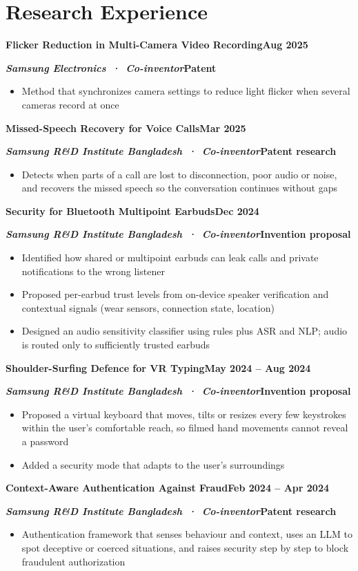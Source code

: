 \documentclass[10pt,letterpaper]{article}
\newcommand{\head}[2]{\Needspace{6\baselineskip}\textbf{#1}\hfill\textbf{#2}\par}
\newcommand{\sub}[2]{\textbf{\textit{#1}}\hfill\textbf{#2}\par}
\newcommand{\gap}{\vspace{3pt}}
\begin{document}
\section{Research Experience}
\head{Flicker Reduction in Multi-Camera Video Recording}{Aug 2025}
\sub{Samsung Electronics \,·\, Co-inventor}{Patent}
\begin{itemize}
  \item Method that synchronizes camera settings to reduce light flicker when several cameras record at once
\end{itemize}
\gap
\head{Missed-Speech Recovery for Voice Calls}{Mar 2025}
\sub{Samsung R\&D Institute Bangladesh \,·\, Co-inventor}{Patent research}
\begin{itemize}
  \item Detects when parts of a call are lost to disconnection, poor audio or noise, and recovers the missed speech so the conversation continues without gaps
\end{itemize}
\gap
\head{Security for Bluetooth Multipoint Earbuds}{Dec 2024}
\sub{Samsung R\&D Institute Bangladesh \,·\, Co-inventor}{Invention proposal}
\begin{itemize}
  \item Identified how shared or multipoint earbuds can leak calls and private notifications to the wrong listener
  \item Proposed per-earbud trust levels from on-device speaker verification and contextual signals (wear sensors, connection state, location)
  \item Designed an audio sensitivity classifier using rules plus ASR and NLP; audio is routed only to sufficiently trusted earbuds
\end{itemize}
\gap
\head{Shoulder-Surfing Defence for VR Typing}{May 2024 -- Aug 2024}
\sub{Samsung R\&D Institute Bangladesh \,·\, Co-inventor}{Invention proposal}
\begin{itemize}
  \item Proposed a virtual keyboard that moves, tilts or resizes every few keystrokes within the user's comfortable reach, so filmed hand movements cannot reveal a password
  \item Added a security mode that adapts to the user's surroundings
\end{itemize}
\gap
\head{Context-Aware Authentication Against Fraud}{Feb 2024 -- Apr 2024}
\sub{Samsung R\&D Institute Bangladesh \,·\, Co-inventor}{Patent research}
\begin{itemize}
  \item Authentication framework that senses behaviour and context, uses an LLM to spot deceptive or coerced situations, and raises security step by step to block fraudulent authorization
\end{itemize}
\end{document}

